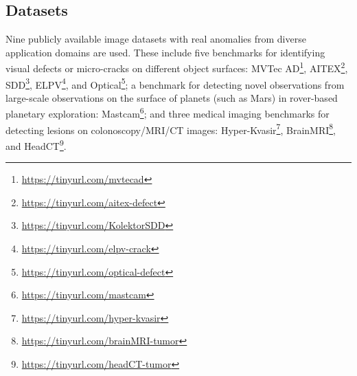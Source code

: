 \documentclass[10pt,journal,compsoc]{IEEEtran}
\begin{document}
\subsection{Datasets}
Nine publicly available image datasets with real anomalies from diverse application domains are used. These include five benchmarks for identifying visual defects or micro-cracks on different object surfaces: MVTec AD\footnote{\url{https://tinyurl.com/mvtecad}}, AITEX\footnote{\url{https://tinyurl.com/aitex-defect}}, SDD\footnote{\url{https://tinyurl.com/KolektorSDD}}, ELPV\footnote{\url{https://tinyurl.com/elpv-crack}}, and Optical\footnote{\url{https://tinyurl.com/optical-defect}}; a benchmark for detecting novel observations from large-scale observations on the surface of planets (such as Mars) in rover-based planetary exploration: Mastcam\footnote{\url{https://tinyurl.com/mastcam}}; and three medical imaging benchmarks for detecting lesions on colonoscopy/MRI/CT images: Hyper-Kvasir\footnote{\url{https://tinyurl.com/hyper-kvasir}}, BrainMRI\footnote{\url{https://tinyurl.com/brainMRI-tumor}}, and HeadCT\footnote{\url{https://tinyurl.com/headCT-tumor}}. 
\end{document}
